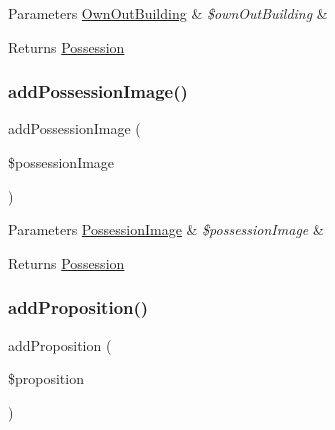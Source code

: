 \begin{DoxyParams}[1]{Parameters}
\mbox{\hyperlink{class_app_1_1_entity_1_1_own_out_building}{Own\+Out\+Building}} & {\em \$own\+Out\+Building} & \\
\hline
\end{DoxyParams}
\begin{DoxyReturn}{Returns}
\mbox{\hyperlink{class_app_1_1_entity_1_1_possession}{Possession}} 
\end{DoxyReturn}
\mbox{\label{class_app_1_1_entity_1_1_possession_aeebbcaa3f823eb078d8a3f70082eb686}} 
\subsubsection{\texorpdfstring{addPossessionImage()}{addPossessionImage()}}
{\footnotesize\ttfamily add\+Possession\+Image (\begin{DoxyParamCaption}\item[{\mbox{\hyperlink{class_app_1_1_entity_1_1_possession_image}{Possession\+Image}}}]{\$possession\+Image }\end{DoxyParamCaption})}


\begin{DoxyParams}[1]{Parameters}
\mbox{\hyperlink{class_app_1_1_entity_1_1_possession_image}{Possession\+Image}} & {\em \$possession\+Image} & \\
\hline
\end{DoxyParams}
\begin{DoxyReturn}{Returns}
\mbox{\hyperlink{class_app_1_1_entity_1_1_possession}{Possession}} 
\end{DoxyReturn}
\mbox{\label{class_app_1_1_entity_1_1_possession_a0fb37c482d114bb0ddea86771b806277}} 
\subsubsection{\texorpdfstring{addProposition()}{addProposition()}}
{\footnotesize\ttfamily add\+Proposition (\begin{DoxyParamCaption}\item[{\mbox{\hyperlink{class_app_1_1_entity_1_1_proposition}{Proposition}}}]{\$proposition }\end{DoxyParamCaption})}


